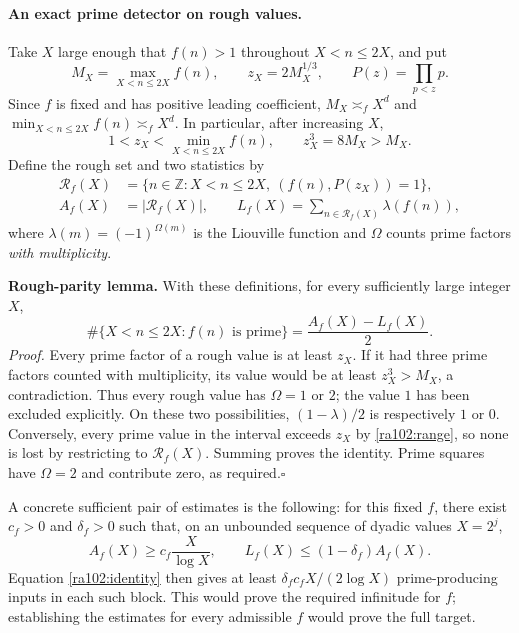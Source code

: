 \documentclass[11pt]{article}
\newcommand{\Z}{\mathbb{Z}}
\begin{document}
\paragraph{An exact prime detector on rough values.}
Take $X$ large enough that $f(n)>1$ throughout $X<n\le2X$, and put
\[
 M_X=\max_{X<n\le2X}f(n),\qquad z_X=2M_X^{1/3},\qquad
 P(z)=\prod_{p<z}p.
\]
Since $f$ is fixed and has positive leading coefficient,
$M_X\asymp_f X^d$ and $\min_{X<n\le2X}f(n)\asymp_f X^d$.
In particular, after increasing $X$,
\begin{equation}\label{ra102:range}
 1<z_X<\min_{X<n\le2X}f(n),\qquad z_X^3=8M_X>M_X.
\end{equation}
Define the rough set and two statistics by
\begin{align*}
 \mathcal R_f(X)&=\{n\in\Z:X<n\le2X,\ (f(n),P(z_X))=1\},\\
 A_f(X)&=|\mathcal R_f(X)|,\qquad
 L_f(X)=\sum_{n\in\mathcal R_f(X)}\lambda(f(n)),
\end{align*}
where $\lambda(m)=(-1)^{\Omega(m)}$ is the Liouville function and
$\Omega$ counts prime factors \emph{with multiplicity}.

\textbf{Rough-parity lemma.} With these definitions, for every sufficiently
large integer $X$,
\begin{equation}\label{ra102:identity}
 \#\{X<n\le2X:f(n)\text{ is prime}\}
       =\frac{A_f(X)-L_f(X)}2.
\end{equation}
\emph{Proof.} Every prime factor of a rough value is at least $z_X$.
If it had three prime factors counted with multiplicity, its value would be
at least $z_X^3>M_X$, a contradiction. Thus every rough value has
$\Omega=1$ or $2$; the value $1$ has been excluded explicitly.
On these two possibilities, $(1-\lambda)/2$ is respectively $1$ or $0$.
Conversely, every prime value in the interval exceeds $z_X$ by
\eqref{ra102:range}, so none is lost by restricting to $\mathcal R_f(X)$.
Summing proves the identity. Prime squares have $\Omega=2$ and contribute
zero, as required.\hfill$\square$

A concrete sufficient pair of estimates is the following: for this fixed
$f$, there exist $c_f>0$ and $\delta_f>0$ such that, on an unbounded sequence
of dyadic values $X=2^j$,
\begin{equation}\label{ra102:missing}
 A_f(X)\ge c_f\frac{X}{\log X},\qquad
 L_f(X)\le(1-\delta_f)A_f(X).
\end{equation}
Equation \eqref{ra102:identity} then gives at least
$\delta_fc_fX/(2\log X)$ prime-producing inputs in each such block.
This would prove the required infinitude for $f$; establishing the estimates
for every admissible $f$ would prove the full target.
\end{document}
